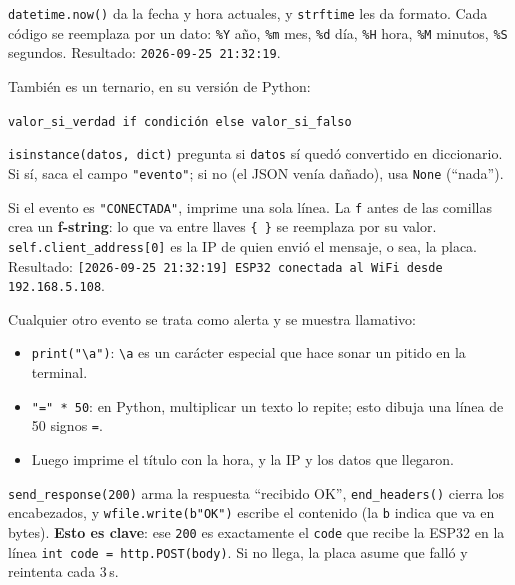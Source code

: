 \documentclass[11pt,a4paper]{article}
\begin{document}
\begin{description}[leftmargin=*,style=nextline]
  \item[Línea 25 --- la hora]
        \texttt{datetime.now()} da la fecha y hora actuales, y \texttt{strftime}
        les da formato. Cada código se reemplaza por un dato: \texttt{\%Y} año,
        \texttt{\%m} mes, \texttt{\%d} día, \texttt{\%H} hora, \texttt{\%M}
        minutos, \texttt{\%S} segundos. Resultado: \texttt{2026-09-25 21:32:19}.
  \item[Línea 26 --- ¿qué evento es?]
        También es un ternario, en su versión de Python:
        \begin{center}
        \texttt{valor\_si\_verdad if condición else valor\_si\_falso}
        \end{center}
        \texttt{isinstance(datos, dict)} pregunta si \texttt{datos} sí quedó
        convertido en diccionario. Si sí, saca el campo \texttt{"evento"}; si no
        (el JSON venía dañado), usa \texttt{None} (``nada'').
  \item[Líneas 27--28 --- mensaje de conexión]
        Si el evento es \texttt{"CONECTADA"}, imprime una sola línea. La
        \texttt{f} antes de las comillas crea un \textbf{f-string}: lo que va entre
        llaves \texttt{\{ \}} se reemplaza por su valor.
        \texttt{self.client\_address[0]} es la IP de quien envió el mensaje, o sea,
        la placa. Resultado:
        \texttt{[2026-09-25 21:32:19] ESP32 conectada al WiFi desde 192.168.5.108}.
  \item[Líneas 29--34 --- mensaje de alerta]
        Cualquier otro evento se trata como alerta y se muestra llamativo:
        \begin{itemize}
          \item \texttt{print("\textbackslash a")}: \texttt{\textbackslash a} es un carácter especial
                que hace sonar un pitido en la terminal.
          \item \texttt{"=" * 50}: en Python, multiplicar un texto lo repite; esto
                dibuja una línea de 50 signos \texttt{=}.
          \item Luego imprime el título con la hora, y la IP y los datos que llegaron.
        \end{itemize}
  \item[Líneas 35--37 --- responder OK]
        \texttt{send\_response(200)} arma la respuesta ``recibido OK'',
        \texttt{end\_headers()} cierra los encabezados, y
        \texttt{wfile.write(b"OK")} escribe el contenido (la \texttt{b} indica que
        va en bytes). \textbf{Esto es clave}: ese \texttt{200} es exactamente el
        \texttt{code} que recibe la ESP32 en la línea \texttt{int code = http.POST(body)}.
        Si no llega, la placa asume que falló y reintenta cada 3\,s.
\end{description}
\end{document}
